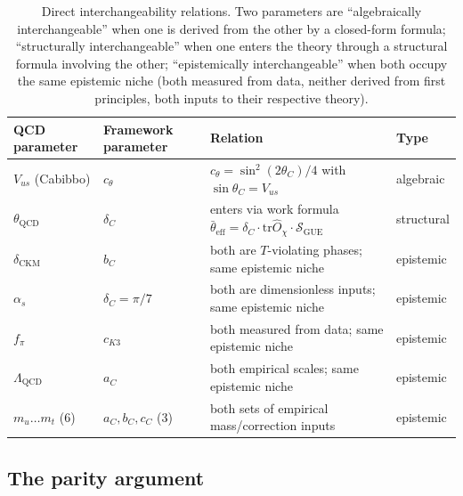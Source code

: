 \documentclass[11pt,a4paper]{article}
\newcommand{\dC}{\delta_C}
\newcommand{\Opchi}{\hat{O}_\chi}
\providecommand{\tr}{}
\renewcommand{\tr}{\mathrm{tr}}
\theoremstyle{plain}
\theoremstyle{definition}
\theoremstyle{remark}
\begin{document}
\begin{table}[h]
\centering
\small
\begin{tabular}{p{2.6cm} p{2.6cm} p{6.6cm} p{1.6cm}}
\toprule
QCD parameter & Framework parameter & Relation & Type \\
\midrule
$V_{us}$ (Cabibbo) & $c_\theta$ & $c_\theta = \sin^2(2\theta_C)/4$ with $\sin\theta_C = V_{us}$ & algebraic \\
$\theta_{\mathrm{QCD}}$ & $\dC$ & enters via work formula $\bar\theta_{\mathrm{eff}} = \dC \cdot \tr\Opchi \cdot \mathcal S_{\mathrm{GUE}}$ & structural \\
$\delta_{\mathrm{CKM}}$ & $b_C$ & both are $T$-violating phases; same epistemic niche & epistemic \\
$\alpha_s$           & $\dC = \pi/7$ & both are dimensionless inputs; same epistemic niche & epistemic \\
$f_\pi$              & $c_{K3}$ & both measured from data; same epistemic niche & epistemic \\
$\Lambda_{\mathrm{QCD}}$ & $a_C$ & both empirical scales; same epistemic niche & epistemic \\
$m_u \dots m_t$ (6)  & $a_C, b_C, c_C$ (3) & both sets of empirical mass/correction inputs & epistemic \\
\bottomrule
\end{tabular}
\caption{Direct interchangeability relations.  Two parameters are
``algebraically interchangeable'' when one is derived from the
other by a closed-form formula; ``structurally interchangeable''
when one enters the theory through a structural formula involving
the other; ``epistemically interchangeable'' when both occupy the
same epistemic niche (both measured from data, neither derived
from first principles, both inputs to their respective theory).}
\label{tab:interchangeability}
\end{table}

\subsection{The parity argument}
\end{document}
